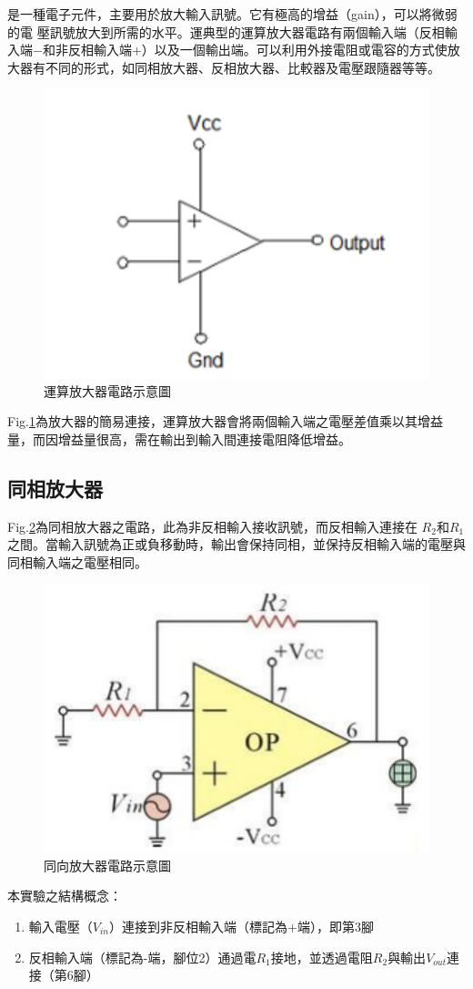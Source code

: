 \documentclass[12pt,a4paper]{article}
\begin{document}
\begin{CJK}{UTF8}{bkai}
是一種電子元件，主要用於放大輸入訊號。它有極高的增益（gain），可以將微弱的電 壓訊號放大到所需的水平。運典型的運算放大器電路有兩個輸入端（反相輸入端−和非反相輸入端+）以及一個輸出端。可以利用外接電阻或電容的方式使放大器有不同的形式，如同相放大器、反相放大器、比較器及電壓跟隨器等等。 

\begin{figure}[h]
    \centering
    \includegraphics[width=0.5\linewidth]{figures/opamp.png}
    \caption{運算放大器電路示意圖}
    \label{fig:opamp}
\end{figure}

Fig.\ref{fig:opamp}為放大器的簡易連接，運算放大器會將兩個輸入端之電壓差值乘以其增益量，而因增益量很高，需在輸出到輸入間連接電阻降低增益。 

\subsection{同相放大器}
\hfill

Fig.\ref{fig:noninvert}為同相放大器之電路，此為非反相輸入接收訊號，而反相輸入連接在 $R_2$和$R_1$之間。當輸入訊號為正或負移動時，輸出會保持同相，並保持反相輸入端的電壓與同相輸入端之電壓相同。


\begin{figure}[h]
    \centering
    \includegraphics[width=0.4\linewidth]{figures/noninvert.png}
    \caption{同向放大器電路示意圖}
    \label{fig:noninvert}
\end{figure}

本實驗之結構概念：
\begin{enumerate}
    \item 輸入電壓（$V_{in}$）連接到非反相輸入端（標記為+端），即第3腳
    \item 反相輸入端（標記為-端，腳位2）通過電$R_1$接地，並透過電阻$R_2$與輸出$V_{out}$連接（第6腳）
\end{enumerate}


\end{CJK}
\end{document}
